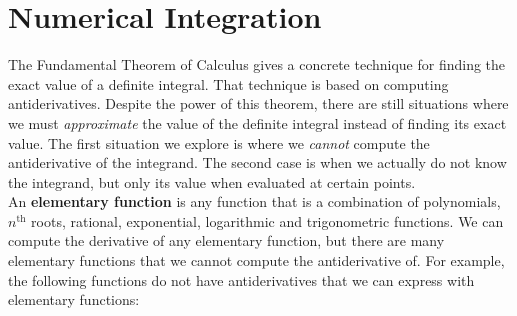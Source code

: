\section{Numerical Integration}\label{sec:numerical_integration}

The Fundamental Theorem of Calculus gives a concrete technique for finding the exact value of a definite integral. That technique is based on computing antiderivatives. Despite the power of this theorem, there are still situations where we must \textit{approximate} the value of the definite integral instead of finding its exact value. The first situation we explore is where we \textit{cannot} compute the antiderivative of the integrand. The second case is when we actually do not know the integrand, but only its value when evaluated at certain points.\\ %


%
An \textbf{elementary function} is any function that is a combination of polynomials, $n^{\text{th}}$ roots, rational, exponential, logarithmic and trigonometric functions. We can compute the derivative of any elementary function, but there are many elementary functions that we cannot compute the antiderivative of. For example, the following functions do not have antiderivatives that we can express with elementary functions:

